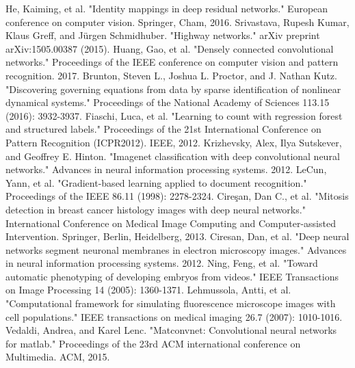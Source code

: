 \documentclass[runningheads]{llncs}
\begin{document}
\begin{thebibliography}{00}
 He, Kaiming, et al. "Identity mappings in deep residual networks." European conference on computer vision. Springer, Cham, 2016.
 Srivastava, Rupesh Kumar, Klaus Greff, and Jürgen Schmidhuber. "Highway networks." arXiv preprint arXiv:1505.00387 (2015).
 Huang, Gao, et al. "Densely connected convolutional networks." Proceedings of the IEEE conference on computer vision and pattern recognition. 2017.
 Brunton, Steven L., Joshua L. Proctor, and J. Nathan Kutz. "Discovering governing equations from data by sparse identification of nonlinear dynamical systems." Proceedings of the National Academy of Sciences 113.15 (2016): 3932-3937.
 Fiaschi, Luca, et al. "Learning to count with regression forest and structured labels." Proceedings of the 21st International Conference on Pattern Recognition (ICPR2012). IEEE, 2012.
Krizhevsky, Alex, Ilya Sutskever, and Geoffrey E. Hinton. "Imagenet classification with deep convolutional neural networks." Advances in neural information processing systems. 2012.
 LeCun, Yann, et al. "Gradient-based learning applied to document recognition." Proceedings of the IEEE 86.11 (1998): 2278-2324.
 Cireşan, Dan C., et al. "Mitosis detection in breast cancer histology images with deep neural networks." International Conference on Medical Image Computing and Computer-assisted Intervention. Springer, Berlin, Heidelberg, 2013.
 Ciresan, Dan, et al. "Deep neural networks segment neuronal membranes in electron microscopy images." Advances in neural information processing systems. 2012.
 Ning, Feng, et al. "Toward automatic phenotyping of developing embryos from videos." IEEE Transactions on Image Processing 14 (2005): 1360-1371.
 Lehmussola, Antti, et al. "Computational framework for simulating fluorescence microscope images with cell populations." IEEE transactions on medical imaging 26.7 (2007): 1010-1016.
 Vedaldi, Andrea, and Karel Lenc. "Matconvnet: Convolutional neural networks for matlab." Proceedings of the 23rd ACM international conference on Multimedia. ACM, 2015.

\end{thebibliography}
\end{document}
